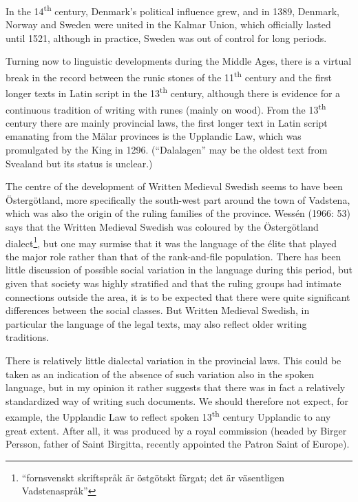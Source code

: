
In the 14\textsuperscript{th} century, Denmark’s political influence grew, and in 1389, Denmark, Norway and Sweden were united in the Kalmar Union, which officially lasted until 1521, although in practice, Sweden was out of control for long periods. 


Turning now to linguistic developments during the Middle Ages, there is a virtual break in the record between the runic stones of the 11\textsuperscript{th} century and the first longer texts in Latin script in the 13\textsuperscript{th} century, although there is evidence for a continuous tradition of writing with runes (mainly on wood). From the 13\textsuperscript{th} century there are mainly provincial laws, the first longer text in Latin script emanating from the Mälar provinces is the Upplandic Law, which was promulgated by the King in 1296. (“Dalalagen” may be the oldest text from Svealand but its status is unclear.) 


The centre of the development of Written Medieval Swedish seems to have been Östergötland, more specifically the south-west part around the town of Vadstena, which was also the origin of the ruling families of the province. Wessén (1966: 53) says that the Written Medieval Swedish was coloured by the Östergötland dialect\footnote{ “fornsvenskt skriftspråk är östgötskt färgat; det är väsentligen Vadstenaspråk” }, but one may surmise that it was the language of the élite that played the major role rather than that of the rank-and-file population. There has been little discussion of possible social variation in the language during this period, but given that society was highly stratified and that the ruling groups had intimate connections outside the area, it is to be expected that there were quite significant differences between the social classes. But Written Medieval Swedish, in particular the language of the legal texts, may also reflect older writing traditions.


There is relatively little dialectal variation in the provincial laws. This could be taken as an indication of the absence of such variation also in the spoken language, but in my opinion it rather suggests that there was in fact a relatively standardized way of writing such documents. We should therefore not expect, for example, the Upplandic Law to reflect spoken 13\textsuperscript{th} century Upplandic to any great extent. After all, it was produced by a royal commission (headed by Birger Persson, father of Saint Birgitta, recently appointed the Patron Saint of Europe). 

